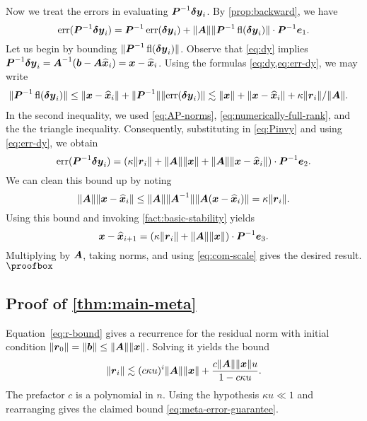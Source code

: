 \documentclass[onefignum,onetabnum,pagebackref,dvipsnames]{siamart220329}
\begin{document}
Now we treat the errors in evaluating $\boldsymbol{P}^{-1}\boldsymbol{\delta y}_i$. 
By \cref{prop:backward}, we have
%
\begin{equation} \label{eq:Pinvy}
    \err(\mat{P}^{-1}\vec{\delta y}_i) = \mat{P}^{-1} \err(\vec{\delta y}_i) + \norm{\mat{A}}\|\mat{P}^{-1}\fl(\vec{\delta y}_i)\| \cdot \mat{P}^{-1}\vec{e}_1.
\end{equation}
%
Let us begin by bounding $\norm{\smash{\mat{P}^{-1}\fl(\vec{\delta y}_i)}}$.
Observe that \cref{eq:dy} implies $\boldsymbol{P}^{-1}\boldsymbol{\delta y}_i = \boldsymbol{A}^{-1}(\boldsymbol{b} - \boldsymbol{A}\boldsymbol{\widehat{x}}_i) = \boldsymbol{x} - \boldsymbol{\widehat{x}}_i$.
Using the formulas \cref{eq:dy,eq:err-dy}, we may write
%
\begin{align*}
    \norm{\smash{\mat{P}^{-1}\fl(\vec{\delta y}_i)}} &\le \norm{\vec{x} - \vec{\hat{x}}_i} + \|\mat{P}^{-1}\|\norm{\err(\vec{\delta y}_i)} \lesssim \norm{\vec{x}} + \norm{\vec{x}-\vec{\hat{x}}_i} + \kappa \norm{\vec{r}_i}/\norm{\mat{A}}.
\end{align*}
%
In the second inequality, we used \cref{eq:AP-norms}, \cref{eq:numerically-full-rank}, and the the triangle inequality.
Consequently, substituting in \cref{eq:Pinvy} and using \cref{eq:err-dy}, we obtain
%
\begin{equation*}
    \err(\mat{P}^{-1}\vec{\delta y}_i) = (\kappa \norm{\vec{r}_i} + \norm{\mat{A}}\norm{\vec{x}} + \norm{\mat{A}}\norm{\vec{x} - \vec{\hat{x}}_i})\cdot \mat{P}^{-1}\vec{e}_2.
\end{equation*}
%
We can clean this bound up by noting
%
\begin{equation*}
    \norm{\mat{A}}\norm{\vec{x} - \vec{\hat{x}}_i} \le \norm{\mat{A}}\|\mat{A}^{-1}\|\norm{\mat{A}(\vec{x} - \vec{\hat{x}}_i)} = \kappa \norm{\vec{r}_i}.
\end{equation*}
%
Using this bound and invoking \cref{fact:basic-stability} yields
%
\begin{equation*}
    \vec{x} - \vec{\hat{x}}_{i+1} = (\kappa \norm{\vec{r}_i} + \norm{\mat{A}}\norm{\vec{x}})\cdot\mat{P}^{-1}\vec{e}_3. 
\end{equation*}
%
Multiplying by $\boldsymbol{A}$, taking norms, and using \cref{eq:com-scale} gives the desired result.
\hfill $\proofbox$

\subsection{Proof of \cref{thm:main-meta}} \label{sec:proof-main-meta}

Equation~\cref{eq:r-bound} gives a recurrence for the residual norm with initial condition $\norm{\vec{r}_0} = \norm{\vec{b}} \le \norm{\mat{A}}\norm{\vec{x}}$.
Solving it yields the bound
%
\begin{equation*}
    \norm{\vec{r}_i} \lesssim (c\kappa u)^i\norm{\mat{A}}\norm{\vec{x}} + \frac{c\norm{\mat{A}}\norm{\vec{x}}u}{1-c\kappa u}.
\end{equation*}
%
The prefactor $c$ is a polynomial in $n$.
Using the hypothesis $\kappa u \ll 1$ and rearranging gives the claimed bound \cref{eq:meta-error-guarantee}.
\end{document}
